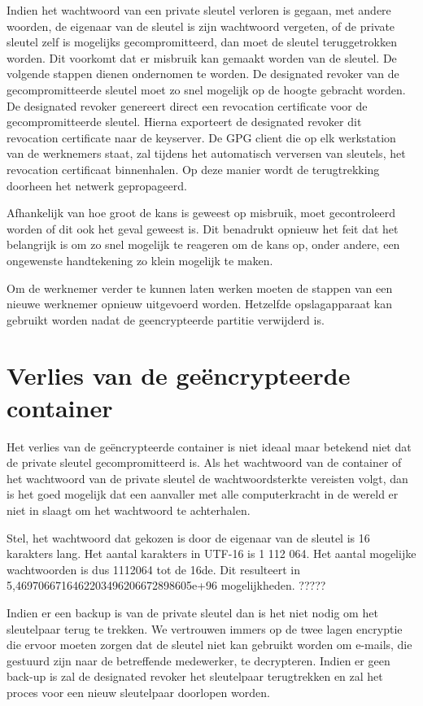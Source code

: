 Indien het wachtwoord van een private sleutel verloren is gegaan, met andere
woorden, de eigenaar van de sleutel is zijn wachtwoord vergeten, of de private
sleutel zelf is mogelijks gecompromitteerd, dan moet de sleutel teruggetrokken
worden. Dit voorkomt dat er misbruik kan gemaakt worden van de sleutel. De
volgende stappen dienen ondernomen te worden. De designated revoker van de
gecompromitteerde sleutel moet zo snel mogelijk op de hoogte gebracht worden. De
designated revoker genereert direct een revocation certificate voor de
gecompromitteerde sleutel. Hierna exporteert de designated revoker dit
revocation certificate naar de keyserver. De GPG client die op elk werkstation
van de werknemers staat, zal tijdens het automatisch verversen van sleutels, het
revocation certificaat binnenhalen. Op deze manier wordt de terugtrekking
doorheen het netwerk gepropageerd.

Afhankelijk van hoe groot de kans is geweest op misbruik, moet gecontroleerd
worden of dit ook het geval geweest is. Dit benadrukt opnieuw het feit dat het
belangrijk is om zo snel mogelijk te reageren om de kans op, onder andere, een
ongewenste handtekening zo klein mogelijk te maken.

Om de werknemer verder te kunnen laten werken moeten de stappen van een nieuwe
werknemer opnieuw uitgevoerd worden. Hetzelfde opslagapparaat kan gebruikt
worden nadat de geencrypteerde partitie verwijderd is.

\section{Verlies van de geëncrypteerde container}
\label{sec:verlies-geencrypteerde-container}

Het verlies van de geëncrypteerde container is niet ideaal maar betekend niet
dat de private sleutel gecompromitteerd is. Als het wachtwoord van de container
of het wachtwoord van de private sleutel de wachtwoordsterkte vereisten volgt,
dan is het goed mogelijk dat een aanvaller met alle computerkracht in de wereld
er niet in slaagt om het wachtwoord te achterhalen.

Stel, het wachtwoord dat gekozen is door de eigenaar van de sleutel is 16
karakters lang. Het aantal karakters in UTF-16 is 1 112 064. Het aantal
mogelijke wachtwoorden is dus 1112064 tot de 16de. Dit resulteert in
5,4697066716462203496206672898605e+96 mogelijkheden. ?????

Indien er een backup is van de private sleutel dan is het niet nodig om het
sleutelpaar terug te trekken. We vertrouwen immers op de twee lagen encryptie
die ervoor moeten zorgen dat de sleutel niet kan gebruikt worden om e-mails, die
gestuurd zijn naar de betreffende medewerker, te decrypteren. Indien er geen
back-up is zal de designated revoker het sleutelpaar terugtrekken en zal het
proces voor een nieuw sleutelpaar doorlopen worden.
